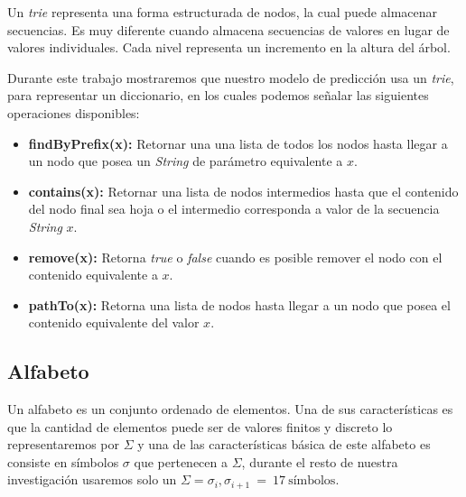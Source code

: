 Un \emph{trie} representa una forma  estructurada de nodos, la cual puede almacenar secuencias. %
Es muy diferente cuando almacena secuencias de valores en lugar de valores individuales. Cada nivel representa un incremento en la altura del árbol.


Durante este trabajo mostraremos que nuestro modelo de predicción usa un \emph{trie}, para representar un diccionario, en los cuales podemos señalar las siguientes operaciones disponibles:

	\begin{itemize}	
		\item \textbf{findByPrefix(x):}  Retornar una una lista de todos los nodos hasta llegar a un nodo que posea un \emph{String} de parámetro equivalente a $x$.
		
		\item \textbf{contains(x):} Retornar una lista de nodos intermedios hasta que el contenido del nodo final sea hoja o el intermedio corresponda a valor de la secuencia \emph{String} $x$.
		
		\item \textbf{remove(x):} Retorna \emph{true} o \emph{false} cuando es posible remover el nodo con el contenido equivalente a $x$.
		
		\item \textbf{pathTo(x):} Retorna una lista de nodos hasta llegar a un nodo que posea el contenido equivalente del valor $x$.
	\end{itemize}







\subsection{Alfabeto} \label{concept-alphabet}

Un alfabeto es un conjunto ordenado de elementos. Una de sus características es que la cantidad de elementos puede ser de valores finitos y discreto lo representaremos por $\Sigma$ y una de las características básica de este alfabeto es consiste en símbolos $\sigma$ que pertenecen a $\Sigma$, durante el resto de nuestra investigación usaremos solo un $\Sigma = \sigma_{i},\sigma_{i+1}\ =\ 17\  \mbox{símbolos}$.



